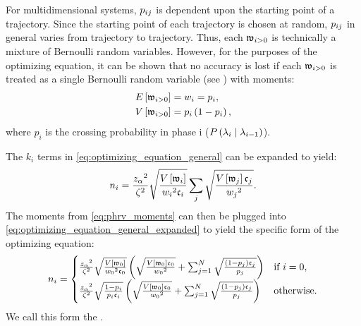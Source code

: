 For multidimensional systems, $p_{i j}$ is dependent upon the starting point of a trajectory. Since the starting point of each trajectory is chosen at random, $p_{i j}$ in general varies from trajectory to trajectory. Thus, each $\mathfrak{w}_{i>0}$ is technically a mixture of Bernoulli random variables. However, for the purposes of the optimizing equation, it can be shown that no accuracy is lost if each $\mathfrak{w}_{i>0}$ is treated as a single Bernoulli random variable (see ) with moments:
    \begin{align}
    \label{eq:phrv_moments}
        \begin{split}
            E \left[ \mathfrak{w}_{i>0} \right] &= w_{i} = p_{i}, \\
            V \left[ \mathfrak{w}_{i>0} \right] &= p_{i} \left( 1 - p_{i} \right),
        \end{split}
    \end{align}
where $p_i$ is the crossing probability in phase i (\ie $P\left(  {\lambda}_{i} \mid {\lambda}_{i - 1}  \right)$). 

The $k_i$ terms in \eqref{eq:optimizing_equation_general} can be expanded to yield:
    \begin{equation}\label{eq:optimizing_equation_general_expanded}
        n_i=\frac{z_{\alpha} {}^2}{\zeta {}^2}\sqrt{\frac{V \left[ \mathfrak{w}_{i} \right]}{w_{i} {}^2 \mathfrak{c}_{i}}}\sum_j \sqrt{\frac{V \left[ \mathfrak{w}_{j} \right] \mathfrak{c}_{j}}{w_{j} {}^2}}.
    \end{equation}
The moments from \eqref{eq:phrv_moments} can then be plugged into \eqref{eq:optimizing_equation_general_expanded} to yield the  specific form of the optimizing equation:
    \begin{equation}
    \label{eq:optimizing_equation_ffpilot}
        \samplecount =
        \begin{cases}
            \frac{\zscoresq}{\moesq} \sqrt{\frac{\pwvtrueshortx{0}}{\pwtruesqx{0} \pctruex{0}}} \left( \sqrt{\frac{\pwvtrueshortx{0} \pctruex{0}}{\pwtruesqx{0}}} + \sum_{j=1}^{\phasecount} \sqrt{\frac{(1 - p_j) \pctruex{j}}{p_j}} \right) & \text{if}\ i=0, \\
            
            \tracingmacros=1
            \frac{\zscoresq}{\moesq} \sqrt{\frac{1 - p_i}{p_i \pctrue}} \left( \sqrt{\frac{\pwvtrueshortx{0} \pctruex{0}}{\pwtruesqx{0}}} + \sum_{j=1}^{\phasecount} \sqrt{\frac{(1 - p_j) \pctruex{j}}{p_j}} \right) & \text{otherwise}.
            \tracingmacros=0
        \end{cases}
    \end{equation}
We call this form the \opteq{}.

